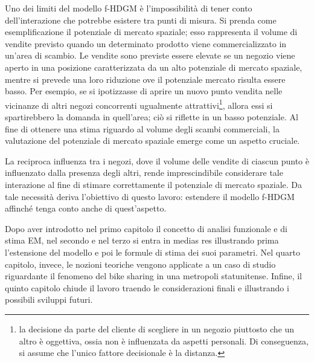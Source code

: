\par Uno dei limiti del modello f-HDGM è l'impossibilità di tener conto dell'interazione che potrebbe esistere tra punti di misura. Si prenda come esemplificazione il potenziale di mercato spaziale; esso rappresenta il volume di vendite previsto quando un determinato prodotto viene commercializzato in un'area di scambio. Le vendite sono previste essere elevate se un negozio viene aperto in una posizione caratterizzata da un alto potenziale di mercato spaziale, mentre si prevede una loro riduzione ove il potenziale mercato risulta essere basso. Per esempio, se si ipotizzasse di aprire un nuovo punto vendita nelle vicinanze di altri negozi concorrenti ugualmente attrattivi\footnote{la decisione da parte del cliente di scegliere in un negozio piuttosto che un altro è oggettiva, ossia non è influenzata da aspetti personali. Di conseguenza, si assume che l'unico fattore decisionale è la distanza.}, allora essi si spartirebbero la domanda in quell'area; ciò si riflette in un basso potenziale. Al fine di ottenere una stima riguardo al volume degli scambi commerciali, la valutazione del potenziale di mercato spaziale emerge come un aspetto cruciale. 
\par La reciproca influenza tra i negozi, dove il volume delle vendite di ciascun punto è influenzato dalla presenza degli altri, rende imprescindibile considerare tale interazione al fine di stimare correttamente il potenziale di mercato spaziale. Da tale necessità deriva l'obiettivo di questo lavoro: estendere il modello f-HDGM affinché tenga conto anche di quest'aspetto.
\par Dopo aver introdotto nel primo capitolo il concetto di analisi funzionale e di stima EM, nel secondo e nel terzo si entra in medias res illustrando prima l'estensione del modello e poi le formule di stima dei suoi parametri. Nel quarto capitolo, invece, le nozioni teoriche vengono applicate a un caso di studio riguardante il fenomeno del bike sharing in una metropoli statunitense. Infine, il quinto capitolo chiude il lavoro traendo le considerazioni finali e illustrando i possibili sviluppi futuri. 